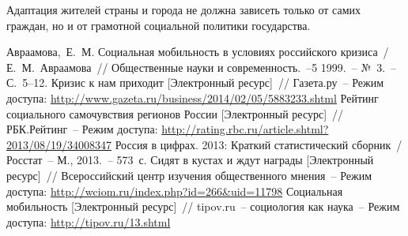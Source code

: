  Адаптация жителей страны и города не должна зависеть только от самих граждан,
  но и от грамотной социальной политики государства.

  \newpage

  \renewcommand{\bibname}{Список литературы}
  \begin{thebibliography}{9}
     Авраамова,~Е.~М. Социальная мобильность в условиях российского
      кризиса~/ Е.~М.~Авраамова~// Общественные науки и современность.~--5
      1999.~-- №~3.~-- С.~5--12.
     Кризис к нам приходит [Электронный ресурс]~//
      Газета.ру~-- Режим доступа:
      \url{http://www.gazeta.ru/business/2014/02/05/5883233.shtml}
     Рейтинг социального самочувствия регионов России
      [Электронный ресурс]~// РБК.Рейтинг~-- Режим доступа:
      \url{http://rating.rbc.ru/article.shtml?2013/08/19/34008347}
     Россия в цифрах. 2013: Краткий статистический сборник~/
      Росстат~-- М., 2013.~-- 573~с.
     Сидят в кустах и ждут награды [Электронный ресурс]~//
      Всероссийский центр изучения общественного мнения~-- Режим доступа:
      \url{http://wciom.ru/index.php?id=266&uid=11798}
     Социальная мобильность [Электронный ресурс]~//
      tipov.ru~-- социология как наука~-- Режим доступа:
      \url{http://tipov.ru/13.shtml}
  \end{thebibliography}


